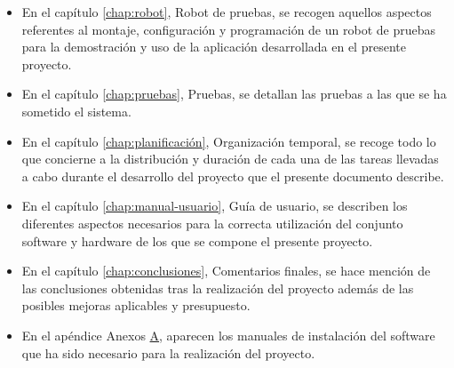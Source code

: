 \begin{itemize}
\item En el capítulo \ref{chap:robot}, Robot de pruebas, se recogen aquellos aspectos referentes al montaje, configuración y programación de un robot de pruebas para la demostración y uso de la aplicación desarrollada en el presente proyecto. 

\item En el capítulo \ref{chap:pruebas}, Pruebas, se detallan las pruebas a las que se ha sometido el sistema.

\item En el capítulo \ref{chap:planificación}, Organización temporal, se recoge todo lo que concierne a la distribución y duración de cada una de las tareas llevadas a cabo durante el desarrollo del proyecto que el presente documento describe.

\item En el capítulo \ref{chap:manual-usuario}, Guía de usuario, se describen los diferentes aspectos necesarios para la correcta utilización del conjunto software y hardware de los que se compone el presente proyecto.

\item En el capítulo \ref{chap:conclusiones}, Comentarios finales, se hace mención de las conclusiones obtenidas tras la realización del proyecto además de las posibles mejoras aplicables y presupuesto.

\item En el apéndice Anexos  \hyperref[appendix:anexos]{A}, aparecen los manuales de instalación del software que ha sido necesario para la realización del proyecto.

\end{itemize}
